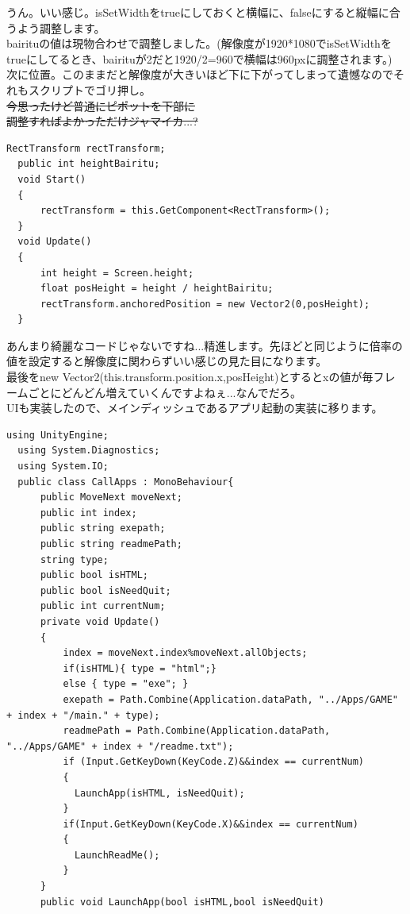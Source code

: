 \documentclass[b5paper,9pt,platex,dvipdfmx]{jsarticle}
\begin{document}
\begin{multicols*}{3}
うん。いい感じ。isSetWidthをtrueにしておくと横幅に、falseにすると縦幅に合うよう調整します。\\
bairituの値は現物合わせで調整しました。(解像度が1920*1080でisSetWidthをtrueにしてるとき、bairituが2だと1920/2=960で横幅は960pxに調整されます。)\\
次に位置。このままだと解像度が大きいほど下に下がってしまって遺憾なのでそれもスクリプトでゴリ押し。\\
\sout{今思ったけど普通にピポットを下部に}\\
\sout{調整すればよかっただけジャマイカ...?}\\
\begin{lstlisting}[caption=SetInfoTex.cs]
  RectTransform rectTransform;
  public int heightBairitu;
  void Start()
  {
      rectTransform = this.GetComponent<RectTransform>();
  }
  void Update()
  {
      int height = Screen.height;
      float posHeight = height / heightBairitu;
      rectTransform.anchoredPosition = new Vector2(0,posHeight);
  }
\end{lstlisting}
あんまり綺麗なコードじゃないですね...精進します。先ほどと同じように倍率の値を設定すると解像度に関わらずいい感じの見た目になります。\\
最後をnew Vector2(this.transform.position.x,posHeight)とするとxの値が毎フレームごとにどんどん増えていくんですよねぇ...なんでだろ。\\
UIも実装したので、メインディッシュであるアプリ起動の実装に移ります。\\
\begin{lstlisting}[caption=CallApps.cs]
  using UnityEngine;
  using System.Diagnostics;
  using System.IO;
  public class CallApps : MonoBehaviour{
      public MoveNext moveNext;
      public int index;
      public string exepath;
      public string readmePath;
      string type;
      public bool isHTML;
      public bool isNeedQuit;
      public int currentNum;
      private void Update()
      {
          index = moveNext.index%moveNext.allObjects;
          if(isHTML){ type = "html";}
          else { type = "exe"; }
          exepath = Path.Combine(Application.dataPath, "../Apps/GAME" + index + "/main." + type);
          readmePath = Path.Combine(Application.dataPath, "../Apps/GAME" + index + "/readme.txt");
          if (Input.GetKeyDown(KeyCode.Z)&&index == currentNum) 
          {
            LaunchApp(isHTML, isNeedQuit);
          }
          if(Input.GetKeyDown(KeyCode.X)&&index == currentNum)
          {
            LaunchReadMe();
          }
      }
      public void LaunchApp(bool isHTML,bool isNeedQuit)

\end{lstlisting}
\end{multicols*}
\end{document}
